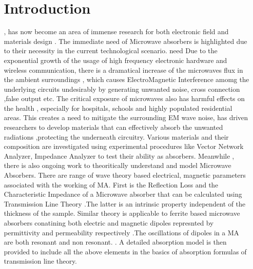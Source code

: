 \documentclass[journal]{IEEEtran}
\begin{document}
\section{Introduction}
% 
% 
% 
% 
 , has now become an area of  immense research for both electronic field and materials design . The immediate need of Microwave absorbers is highlighted due to their necessity in the current technological scenario. need Due to the exponential growth of the usage of high frequency  electronic hardware and wireless communication, there is a dramatical increase of the microwaves flux in the ambient surroundings , which causes ElectroMagnetic Interference amomg the underlying circuits undesirably by generating unwanted noise, cross connection ,false output etc. The critical exposure of microwaves  also has harmful effects on the health , especially for hospitals, schools and highly populated residential areas. This creates a  need to mitigate the surrounding EM wave  noise, has driven researchers to develop materials that can effectively absorb the unwanted radiations ,protecting the underneath circuitry. Various materials and their composition are investigated using experimental procedures like Vector Network Analyzer, Impedance Analyzer to test their ability as absorbers. Meanwhile , there is also ongoing work to theoritically understand and model Microwave Absorbers. There are range of wave theory based electrical, magnetic parameters associated with the working of MA.
First is the Reflection Loss and the Characteristic Impedance of a Microwave absorber that can be calculated using Transmission Line Theory \cite{YingL2}.The latter is an intrinsic property independent of the thickness of the sample.
Similar theory is applicable to ferrite based microwave absorbers conatining both electric and magnetic dipoles represnted by  permittivity and permeability respectively \cite{YingL}.The oscillations of dipoles in a MA are both resonant and non resonant. . A detailed absorption model is then provided to include all the above elements in the basics of absorption formulas of transmission line theory.
\end{document}
